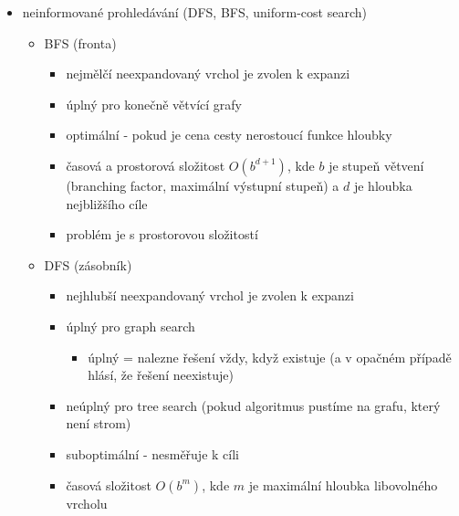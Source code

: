 \begin{itemize}
\begin{itemize}
\item graph search si navíc ukládá \quotedblbase{}uzavřenost\textquotedblleft{} vrcholu (jestli už jsme vrchol viděli)
\begin{itemize}
\item takže nenastávají problémy s cykly
\item kvůli tomu, že stavový prostor může být nekonečný, neinicializujeme všechny vrcholy, ale místo toho použijeme hešovací tabulku
\end{itemize}
\item i tree search lze použít k prohledávání grafů s cykly, ale může se chovat divně
\item u prohledávání DAGů tree search nezaručuje, že se prohledané stavy nebudou opakovat (opakovat se můžou, pokud do stejného vrcholu vedou dvě orientované cesty)
\end{itemize}
\item neinformované prohledávání (DFS, BFS, uniform-cost search)
\begin{itemize}
\item BFS (fronta)
\begin{itemize}
\item nejmělčí neexpandovaný vrchol je zvolen k expanzi
\item úplný pro konečně větvící grafy
\item optimální - pokud je cena cesty nerostoucí funkce hloubky
\item časová a prostorová složitost $O(b^{d+1})$, kde $b$ je stupeň větvení (branching factor, maximální výstupní stupeň) a $d$ je hloubka nejbližšího cíle
\item problém je s prostorovou složitostí
\end{itemize}
\item DFS (zásobník)
\begin{itemize}
\item nejhlubší neexpandovaný vrchol je zvolen k expanzi
\item úplný pro graph search
\begin{itemize}
\item úplný = nalezne řešení vždy, když existuje (a v opačném případě hlásí, že řešení neexistuje)
\end{itemize}
\item neúplný pro tree search (pokud algoritmus pustíme na grafu, který není strom)
\item suboptimální - nesměřuje k cíli
\item časová složitost $O(b^m)$, kde $m$ je maximální hloubka libovolného vrcholu

\end{itemize}
\end{itemize}
\end{itemize}
